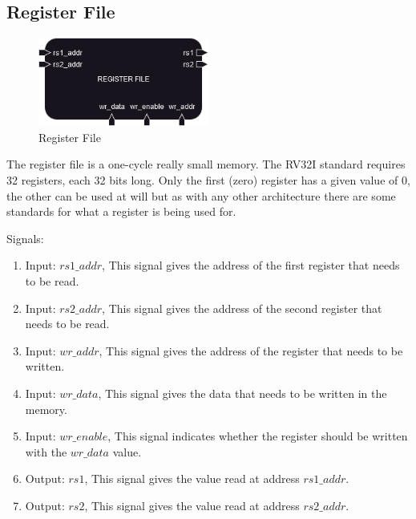 \subsection{Register File}

\begin{figure}[H]
    \centering
    \includegraphics[width=0.5\textwidth]{../diagrams/rom_ram_reg/register_file.png}
    \caption{Register File}
    \label{fig:register_file}
\end{figure}

The register file is a one-cycle really small memory. The RV32I standard requires 32 registers, each 32 bits long. Only the first (zero) register
has a given value of 0, the other can be used at will but as with any other architecture there are some standards for what a register is being used 
for.

Signals:
\begin{enumerate}[label={\textbullet}]
    \item Input: $rs1\_addr$, This signal gives the address of the first register that needs to be read.
    \item Input: $rs2\_addr$, This signal gives the address of the second register that needs to be read.
    \item Input: $wr\_addr$, This signal gives the address of the register that needs to be written.
    \item Input: $wr\_data$, This signal gives the data that needs to be written in the memory.
    \item Input: $wr\_enable$, This signal indicates whether the register should be written with the $wr\_data$ value.
    \item Output: $rs1$, This signal gives the value read at address $rs1\_addr$.
    \item Output: $rs2$, This signal gives the value read at address $rs2\_addr$.
\end{enumerate}